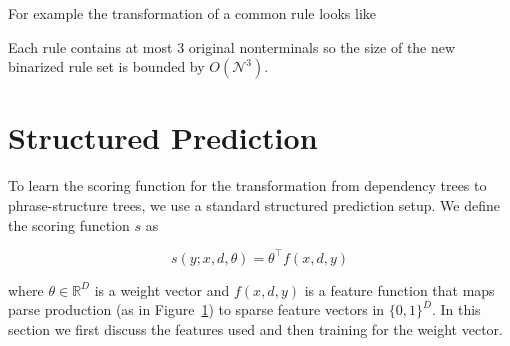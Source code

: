 \documentclass[11pt,letterpaper]{article}
\newcommand{\nonterms}{\mathcal{N}}
\newcommand{\Reals}{\mathbb{R}}
\begin{document}
\noindent For example the transformation of a common rule looks like

\begin{center}
  \scalebox{0.6}{ \Tree [ .S NP VP$^*$ NP NP ] $\Rightarrow$ \Tree [
    .S NP [ .S$^{\Rightarrow*}$ [ .S$^{\Rightarrow*}_{NP}$ VP$^*$ NP ]
    NP ] ] }
\end{center}

\noindent Each rule contains at most 3 original nonterminals so the size of the new binarized rule set is bounded by $O(\nonterms^3)$.









\section{Structured Prediction}

To learn the scoring function for the transformation from dependency trees to phrase-structure trees,
we use a standard structured prediction setup.
We define the scoring function $s$ as

\[s(y;x, d, \theta) =  \theta^{\top} f(x, d, y) \]

\noindent
where $\theta \in \Reals^D $ is a weight vector  and $f(x, d, y)$ is a feature function that maps parse production (as in Figure~\ref{}) to sparse feature vectors in $\{0,1\}^D$. In this section we first discuss the features used and then training for the weight vector.
\end{document}
